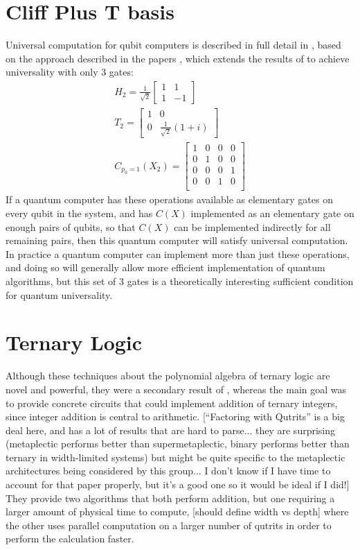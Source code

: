 \documentclass[]{article}
\begin{document}
\section{Cliff Plus T basis}
Universal computation for qubit computers is described in full detail in \cite{textbook}, based on the approach described in the papers \cite{universal-qubit}, which extends the results of \cite{cnot-decomposition} to achieve universality with only 3 gates:
\begin{align*}
	H_2 = \frac{1}{\sqrt{2}}\left[\begin{matrix}
		1 & 1 \\
		1 & -1
	\end{matrix}\right]
	\\
	T_2 = \left[\begin{matrix}
		1 & 0 \\
		0 & \frac{1}{\sqrt{2}}\left(1+ i\right)
	\end{matrix}\right]
	\\
	C_{p_0=1}(X_2) = \left[\begin{matrix}
		1 & 0 & 0 & 0 \\
		0 & 1 & 0 & 0 \\
		0 & 0 & 0 & 1 \\
		0 & 0 & 1 & 0 \\
	\end{matrix}\right]
\end{align*}
If a quantum computer has these operations available as elementary gates on every qubit in the system, and has $C(X)$ implemented as an elementary gate on enough pairs of qubits, so that $C(X)$ can be implemented indirectly for all remaining pairs, then this quantum computer will satisfy universal computation. In practice a quantum computer can implement more than just these operations, and doing so will generally allow more efficient implementation of quantum algorithms, but this set of 3 gates is a theoretically interesting sufficient condition for quantum universality.
\section{Ternary Logic}
Although these techniques about the polynomial algebra of ternary logic are novel and powerful, they were a secondary result of \cite{arithmetics}, whereas the main goal was to provide concrete circuits that could implement addition of ternary integers, since integer addition is central to arithmetic. [``Factoring with Qutrits'' is a big deal here, and has a lot of results that are hard to parse... they are surprising (metaplectic performs better than supermetaplectic, binary performs better than ternary in width-limited systems) but might be quite specific to the metaplectic architectures being considered by this group... I don't know if I have time to account for that paper properly, but it's a good one so it would be ideal if I did!] They provide two algorithms that both perform addition, but one requiring a larger amount of physical time to compute, [should define width vs depth] where the other uses parallel computation on a larger number of qutrits in order to perform the calculation faster.
\end{document}
